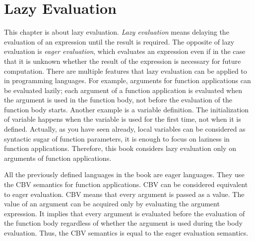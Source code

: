 \setchapterpreamble[u]{\margintoc}
\chapter{Lazy Evaluation}

\renewcommand{\plang}{\textsf{FAE}\xspace}
\renewcommand{\lang}{\textsf{LFAE}\xspace}

This chapter is about lazy evaluation. \textit{Lazy evaluation} means delaying the evaluation of an expression until the result
is required. The opposite of lazy evaluation is \textit{eager
evaluation}, which evaluates an expression even if in
the case that it is unknown whether the result of the expression is necessary
for future computation. There are multiple features that lazy evaluation can be
applied to in programming languages. For example, arguments for function
applications can be evaluated lazily; each argument of a function application is
evaluated when the argument is used in the function body, not before the
evaluation of the function body starts. Another example is a variable
definition. The initialization of variable happens when the variable is
used for the first time, not when it is defined. Actually, as you have seen
already, local variables can be considered as syntactic sugar of function
parameters, it is enough to focus on laziness in function applications.
Therefore, this book considers lazy evaluation only on arguments of function
applications.

All the previously defined languages in the book are eager languages. They use
the CBV semantics for function applications. CBV can be considered equivalent to
eager evaluation. CBV means that every argument is passed as a value. The value
of an argument can be acquired only by evaluating the argument expression. It
implies that every argument is evaluated before the evaluation of the function
body regardless of whether the argument is used during the body evaluation.
Thus, the CBV semantics is equal to the eager evaluation semantics.

